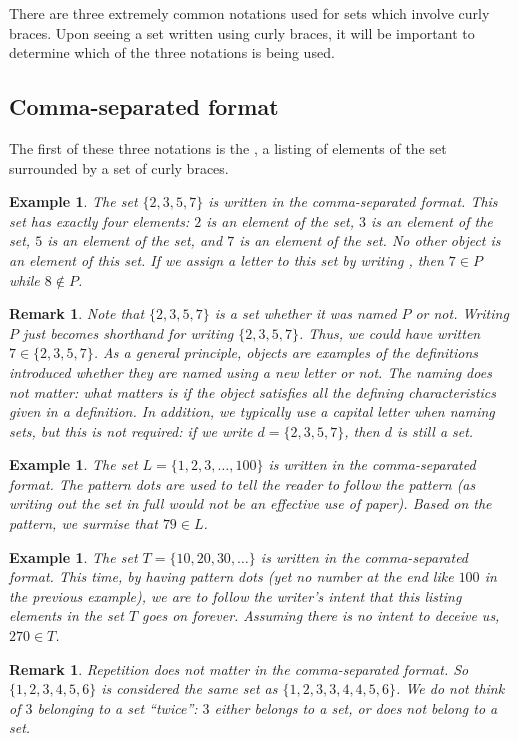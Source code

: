 \documentclass{book}
\newcounter{ekcounter}%
\theoremstyle{ekimcustom}
\newtheorem{example}[ekcounter]{Example}
\newtheorem{remark}[ekcounter]{Remark}
\newcommand\defn[1]{{\color{blue}{\bf #1}}}
\begin{document}
There are three extremely common notations used for sets which involve curly braces. Upon seeing a set written using curly braces, it will be important to determine which of the three notations is being used.

\subsection{Comma-separated format}

The first of these three notations is the \defn{comma-separated format}, a listing of elements of the set surrounded by a set of curly braces.
\begin{example}
The set $\{2,3,5,7\}$ is written in the comma-separated format. This set has exactly four elements: $2$ is an element of the set, $3$ is an element of the set, $5$ is an element of the set, and $7$ is an element of the set. No other object is an element of this set. If we assign a letter to this set by writing , then $7 \in P$ while $8 \not\in P$.
\end{example}
\begin{remark}\label{remark:set-name}
Note that $\{2,3,5,7\}$ is a set whether it was named $P$ or not. Writing $P$ just becomes shorthand for writing $\{2,3,5,7\}$. Thus, we could have written $7 \in \{2,3,5,7\}$. As a general principle, objects are examples of the definitions introduced whether they are named using a new letter or not. The naming does not matter: what matters is if the object satisfies all the defining characteristics given in a definition. In addition, we typically use a capital letter when naming sets, but this is not required: if we write $d = \{2,3,5,7\}$, then $d$ is still a set.
\end{remark}
\begin{example}
The set $L=\{1,2,3,\dots,100\}$ is written in the comma-separated format. The pattern dots are used to tell the reader to follow the pattern (as writing out the set in full would not be an effective use of paper). Based on the pattern, we surmise that $79 \in L$.
\end{example}
\begin{example}
The set $T=\{10,20,30,\dots\}$ is written in the comma-separated format. This time, by having pattern dots (yet no number at the end like $100$ in the previous example), we are to follow the writer's intent that this listing elements in the set $T$ goes on forever. Assuming there is no intent to deceive us, $270 \in T$.
\end{example}
\begin{remark}\label{remark:set-element-repetition}
Repetition does not matter in the comma-separated format. So $\{1,2,3,4,5,6\}$ is considered the same set as $\{1,2,3,3,4,4,5,6\}$. We do not think of $3$ belonging to a set ``twice'': $3$ either belongs to a set, or does not belong to a set.
\end{remark}
\end{document}
